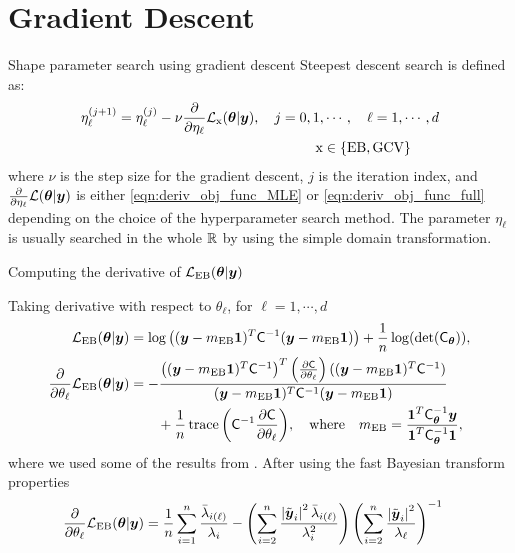 \documentclass[handout, 10pt,compress,xcolor={usenames,dvipsnames}]{beamer} %
\newcommand{\bm}[1]{\boldsymbol{#1}}
\newcommand{\smallcite}[1]{{\small\cite{#1}}}
\newcommand{\MLE}{\textup{EB}}
\newcommand{\GCV}{\textup{GCV}}
\newcommand{\mCInv}{\mC^{-1}}
\renewcommand{\vtheta}{{\bm{\theta}}}
\newcommand{\mCthetaInv}{{\mathsf{C}^{-1}_{\vtheta}}}
\def\abs#1{\ensuremath{\left \lvert #1 \right \rvert}}
\begin{document}
\section{Gradient Descent}

\begin{frame}{Shape parameter search using gradient descent}
	Steepest descent search is defined as:
	\begin{align*}
	\eta^{(j+1)}_\ell &= \eta^{(j)}_\ell - \nu \frac{\partial}{\partial \eta_\ell} \mathcal{L}_{\bm{\textup{x}}}(\vtheta | \vy), \quad j=0,1,\cdots, \quad \ell = 1, \cdots, d \\
	& \hspace{5cm} \bm{\textup{x}} \in \{\MLE, \GCV\}
	\end{align*}
	where $\nu$ is the step size for the gradient descent, $j$ is the iteration index, and $\frac{\partial}{\partial \eta_\ell} \mathcal{L}(\vtheta | \vy)$ is either \eqref{eqn:deriv_obj_func_MLE} or \eqref{eqn:deriv_obj_func_full} depending on the choice of the hyperparameter search method. The parameter $\eta_\ell$ is usually searched in the whole $\mathbb{R}$ by using the simple domain transformation.
\end{frame}








\begin{frame}{Computing the derivative of $\mathcal{L}_{\MLE}(\vtheta | \vy)$}
	
	Taking derivative with respect to $\theta_\ell$, for $\ell=1,\cdots,d$
	\begin{align*}
	\mathcal{L}_{\MLE}(\vtheta | \vy)
	& = \log\left( {(\vy-m_\MLE\vone)^T\mCInv(\vy-m_\MLE\vone)} \right) + \frac{1}{n} \log(\det(\mC_\vtheta)),
	\\
	\frac{\partial}{\partial \theta_\ell} \mathcal{L}_{\MLE}(\vtheta | \vy)
	& = - \frac
	{\left((\vy-m_\MLE\vone)^T\mCInv\right)^T 
		\left( \frac{\partial \mC}{\partial \theta_\ell} \right)
		((\vy-m_\MLE\vone)^T\mCInv)}
	{(\vy-m_\MLE\vone)^T\mCInv(\vy-m_\MLE\vone)}
	\\ & \qquad
	+ \frac 1n \trace{\left( \mCInv \frac{\partial \mC}{\partial \theta_\ell} \right)}
	, \quad \text{where} \quad m_\MLE = \frac{\vone^T \mCthetaInv \vy }{ \vone^T \mCthetaInv \vone}, 
	\end{align*}
	where we used some of the results from \smallcite{Dong2017a}.  After using the fast Bayesian transform properties
	\begin{align}
	\label{eqn:deriv_obj_func_MLE}
	\frac{\partial}{\partial \theta_\ell} \mathcal{L}_{\MLE}(\vtheta | \vy)
	&=  \frac 1n \sum_{i=1}^{n} \frac{\bar{\lambda}_{i(\ell)}}{\lambda_i}
	- \left({ \sum_{i=2}^n \frac{\abs{\tvy_i}^2 \bar{\lambda}_{i(\ell)}}{\lambda_i^2}}\right)
	\left( {\sum_{i=2}^n \frac{\abs{\tvy_i}^2}{\lambda_\ell}} \right)^{-1}
	\end{align}
	
\end{frame}
\end{document}
